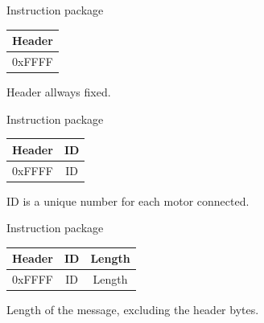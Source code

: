 \documentclass{beamer}
\begin{document}


\begin{frame}{Instruction package}
    
        \begin{table}
            \begin{flushleft}
                \begin{tabular}{| c |}
                    \hline
                    Header\\
                    \hline
                    0xFFFF\\
                    \hline
                \end{tabular}
            \end{flushleft}
        \end{table}

        Header allways fixed.

\end{frame}



\begin{frame}{Instruction package}
 
    \begin{table}
        \begin{flushleft}
            \begin{tabular}{| c | c |}
                \hline
                Header & ID\\
                \hline
                0xFFFF & ID\\
                \hline
            \end{tabular}
        \end{flushleft}
    \end{table}

    ID is a unique number for each motor connected.
    
\end{frame}




\begin{frame}{Instruction package}
 
    \begin{table}
        \begin{flushleft}
            \begin{tabular}{| c | c | c |}
                \hline
                Header & ID & Length\\
                \hline
                0xFFFF & ID & Length \\
                \hline
            \end{tabular}
        \end{flushleft}
    \end{table}

    Length of the message, excluding the header bytes.
    
\end{frame}
\end{document}
